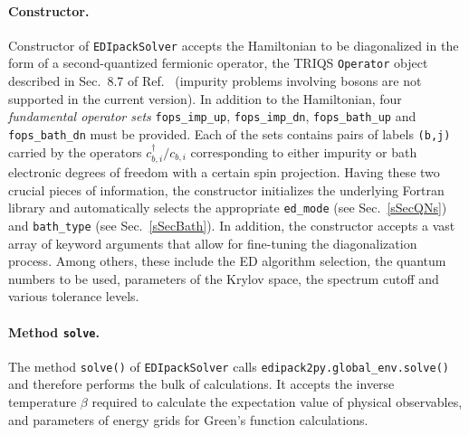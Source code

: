 \documentclass[edipack_sp.tex]{subfiles}
\begin{document}
\paragraph{{\bf Constructor}.}
Constructor of {\tt EDIpackSolver} accepts the Hamiltonian to be diagonalized
in the form of a second-quantized fermionic operator, the TRIQS {\tt Operator}
object described in Sec.~8.7 of Ref.~ (impurity 
problems involving bosons are not supported in the current version). In 
addition to the Hamiltonian, four {\it fundamental operator sets}
{\tt fops\_imp\_up}, {\tt fops\_imp\_dn}, {\tt fops\_bath\_up} and
{\tt fops\_bath\_dn} must be provided.
Each of the sets contains pairs of labels {\tt (b,j)} carried
by the operators $c^\dagger_{b,i} / c_{b,i}$ corresponding to either impurity
or bath electronic degrees of freedom with a certain spin projection.
Having these two crucial pieces of information, the constructor initializes
the underlying Fortran library and automatically selects the appropriate
{\tt ed\_mode} (see Sec.~\ref{sSecQNs}) and
{\tt bath\_type} (see Sec.~\ref{sSecBath}). In addition, the
constructor accepts a vast array of keyword arguments that allow for fine-tuning
the diagonalization process. Among others, these include the ED algorithm
selection, the quantum numbers to be used, parameters of the Krylov space,
the spectrum cutoff and various tolerance levels.

\paragraph{{\bf Method {\tt solve}}.}
The method {\tt solve()} of {\tt EDIpackSolver} calls
{\tt edipack2py.global\_env.solve()} and therefore performs the bulk of
calculations. It accepts the inverse temperature $\beta$ required to calculate
the expectation value of physical observables, and parameters of energy grids
for Green's function calculations.
\end{document}

